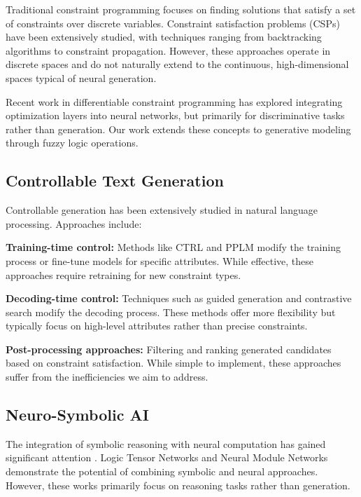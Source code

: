 \documentclass[conference]{IEEEtran}
\begin{document}
Traditional constraint programming \cite{rossi2006handbook} focuses on finding solutions that satisfy a set of constraints over discrete variables. Constraint satisfaction problems (CSPs) have been extensively studied, with techniques ranging from backtracking algorithms to constraint propagation. However, these approaches operate in discrete spaces and do not naturally extend to the continuous, high-dimensional spaces typical of neural generation.

Recent work in differentiable constraint programming \cite{amos2017optnet} has explored integrating optimization layers into neural networks, but primarily for discriminative tasks rather than generation. Our work extends these concepts to generative modeling through fuzzy logic operations.

\subsection{Controllable Text Generation}

Controllable generation has been extensively studied in natural language processing. Approaches include:

\textbf{Training-time control:} Methods like CTRL \cite{keskar2019ctrl} and PPLM \cite{dathathri2019plug} modify the training process or fine-tune models for specific attributes. While effective, these approaches require retraining for new constraint types.

\textbf{Decoding-time control:} Techniques such as guided generation \cite{lu2022neurologic} and contrastive search \cite{su2022contrastive} modify the decoding process. These methods offer more flexibility but typically focus on high-level attributes rather than precise constraints.

\textbf{Post-processing approaches:} Filtering and ranking generated candidates based on constraint satisfaction. While simple to implement, these approaches suffer from the inefficiencies we aim to address.

\subsection{Neuro-Symbolic AI}

The integration of symbolic reasoning with neural computation has gained significant attention \cite{garcez2019neural}. Logic Tensor Networks \cite{serafini2016logic} and Neural Module Networks \cite{andreas2016neural} demonstrate the potential of combining symbolic and neural approaches. However, these works primarily focus on reasoning tasks rather than generation.
\end{document}

